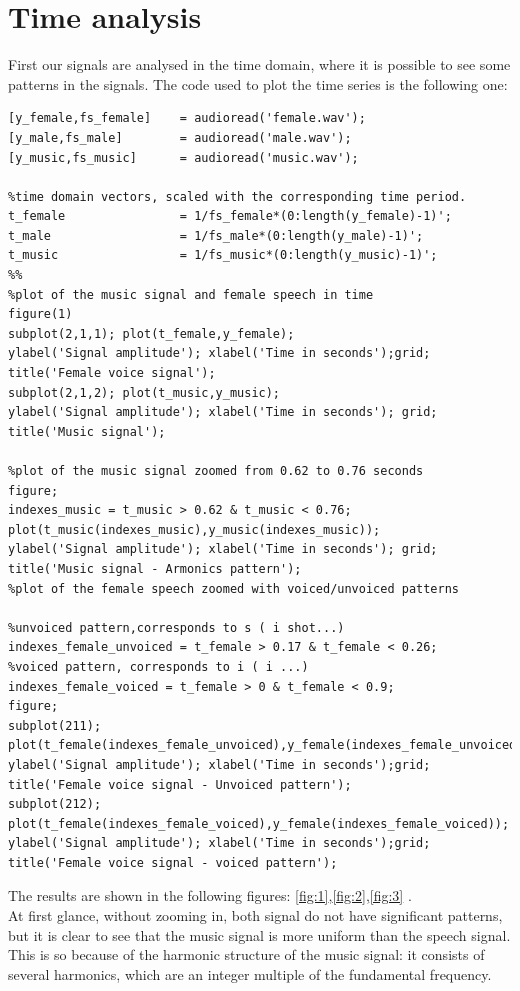 \section{Time analysis}
First our signals are analysed in the time domain, where it is possible to see some patterns in the signals. The code used to plot the time series is the following one:
\begin{lstlisting}
[y_female,fs_female]    = audioread('female.wav');
[y_male,fs_male]        = audioread('male.wav');
[y_music,fs_music]      = audioread('music.wav');

%time domain vectors, scaled with the corresponding time period.
t_female                = 1/fs_female*(0:length(y_female)-1)';
t_male                  = 1/fs_male*(0:length(y_male)-1)';
t_music                 = 1/fs_music*(0:length(y_music)-1)';
%%
%plot of the music signal and female speech in time
figure(1)
subplot(2,1,1); plot(t_female,y_female);
ylabel('Signal amplitude'); xlabel('Time in seconds');grid;
title('Female voice signal');
subplot(2,1,2); plot(t_music,y_music);
ylabel('Signal amplitude'); xlabel('Time in seconds'); grid;
title('Music signal');

%plot of the music signal zoomed from 0.62 to 0.76 seconds
figure;
indexes_music = t_music > 0.62 & t_music < 0.76; 
plot(t_music(indexes_music),y_music(indexes_music));
ylabel('Signal amplitude'); xlabel('Time in seconds'); grid;
title('Music signal - Armonics pattern');
%plot of the female speech zoomed with voiced/unvoiced patterns

%unvoiced pattern,corresponds to s ( i shot...)
indexes_female_unvoiced = t_female > 0.17 & t_female < 0.26; 
%voiced pattern, corresponds to i ( i ...)
indexes_female_voiced = t_female > 0 & t_female < 0.9; 
figure;
subplot(211);
plot(t_female(indexes_female_unvoiced),y_female(indexes_female_unvoiced));
ylabel('Signal amplitude'); xlabel('Time in seconds');grid;
title('Female voice signal - Unvoiced pattern');
subplot(212);
plot(t_female(indexes_female_voiced),y_female(indexes_female_voiced));
ylabel('Signal amplitude'); xlabel('Time in seconds');grid;
title('Female voice signal - voiced pattern');
\end{lstlisting}
The results are shown in the following figures: \ref{fig:1},\ref{fig:2},\ref{fig:3} .\\ 
At first glance, without zooming in, both signal do not have significant patterns, but it is clear to see that the music signal is more uniform than the speech signal. \\
This is so because of the harmonic structure of the music signal: it consists of several harmonics, which are an integer multiple of the fundamental frequency.

